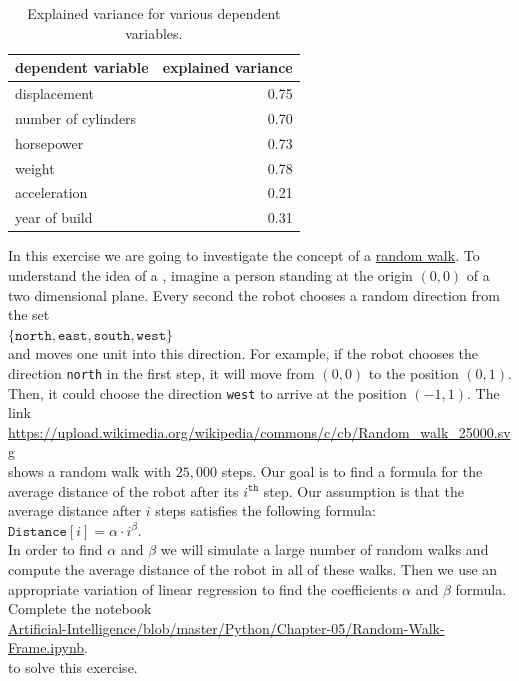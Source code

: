 \begin{table}
  \centering
  \begin{tabular}{|l|r|}
  \hline
  dependent variable  & explained variance   \\
  \hline
  \hline
  displacement        & 0.75                 \\
  \hline
  number of cylinders & 0.70                 \\
  \hline
  horsepower          & 0.73                 \\
  \hline
  weight              & 0.78                 \\
  \hline
  acceleration        & 0.21                 \\
  \hline
  year of build       & 0.31                 \\
  \hline
  \end{tabular}
  \caption[explained variance]{Explained variance for various dependent variables.}
  \label{tab:explained-variance}
\end{table}

\exercise
In this exercise we are going to investigate the concept of a
\href{https://en.wikipedia.org/wiki/Random_walk}{random walk}.
To understand the idea of a , imagine a person standing at the origin $(0,0)$ of a two
dimensional plane.  Every second the robot chooses a random direction from the set
\\[0.2cm]
\hspace*{1.3cm}
$\{ \texttt{north},  \texttt{east},  \texttt{south},  \texttt{west} \}$
\\[0.2cm]
and moves one unit into this direction.  For example, if the robot chooses the direction \texttt{north} in the
first step, it will move from $(0,0)$ to the position $(0,1)$.  Then, it could choose the direction
\texttt{west} to arrive at the position $(-1,1)$.  The link
\\[0.2cm]
\hspace*{1.3cm}
\href{https://upload.wikimedia.org/wikipedia/commons/c/cb/Random_walk_25000.svg}{https://upload.wikimedia.org/wikipedia/commons/c/cb/Random\_walk\_25000.svg}
\\[0.2cm]
shows a random walk with $25,000$ steps.  Our goal is to find a formula for the average distance of the robot
after its $i^\texttt{th}$ step.  Our assumption is that the average distance after $i$ steps satisfies the
following formula:
\\[0.2cm]
\hspace*{1.3cm}
$\mathtt{Distance}[i] = \alpha \cdot i^\beta$.
\\[0.2cm]
In order to find $\alpha$ and $\beta$ we will simulate a large number of random walks and compute
the average distance of the robot in all of these walks.  Then we use an appropriate variation of linear
regression to find the coefficients $\alpha$ and $\beta$ formula.  Complete the notebook
\\[0.2cm]
\hspace*{0.8cm}
\href{https://github.com/karlstroetmann/Artificial-Intelligence/blob/master/Python/Chapter-05/Random-Walk-Frame.ipynb}{
   Artificial-Intelligence/blob/master/Python/Chapter-05/Random-Walk-Frame.ipynb}.
\\[0.2cm]
to solve this exercise.
\eox

